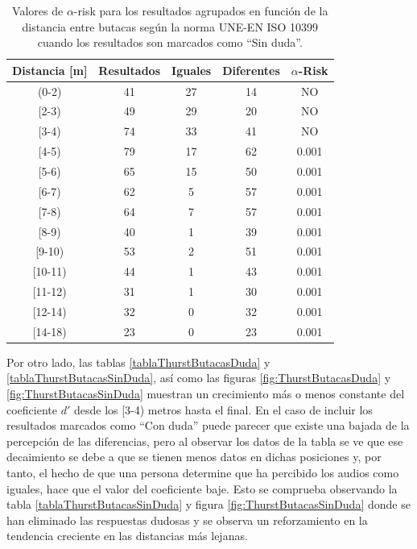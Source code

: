 \documentclass[11pt,a4paper,twoside]{book}
\begin{document}
		    \begin{table}
			\begin{center}
			\begin{scriptsize}
			\begin{tabular}{| c | c | c | c || c |}
			    \hline
				\textbf{Distancia [m]}&\textbf{Resultados}&\textbf{Iguales}&\textbf{Diferentes}&\textbf{$\alpha$-Risk}\\ \hline
                (0-2)&41&27&14&NO\\ \hline
                [2-3)&49&29&20&NO\\ \hline
                [3-4)&74&33&41&NO\\ \hline
                [4-5)&79&17&62&0.001\\ \hline
                [5-6)&65&15&50&0.001\\ \hline
                [6-7)&62&5&57&0.001\\ \hline
                [7-8)&64&7&57&0.001\\ \hline
                [8-9)&40&1&39&0.001\\ \hline
                [9-10)&53&2&51&0.001\\ \hline
                [10-11)&44&1&43&0.001\\ \hline
                [11-12)&31&1&30&0.001\\ \hline
                [12-14)&32&0&32&0.001\\ \hline
                [14-18)&23&0&23&0.001\\ \hline
			\end{tabular}
			\caption{Valores de $\alpha$-risk para los resultados agrupados en función de la distancia entre butacas según la norma UNE-EN ISO 10399 cuando los resultados son marcados como ``Sin duda''.}
			\label{tablaISOButacasSinDuda}
			\end{scriptsize}
			\end{center}	
		    \end{table}
            
            \newpage
            Por otro lado, las tablas \ref{tablaThurstButacasDuda} y \ref{tablaThurstButacasSinDuda}, así como las figuras \ref{fig:ThurstButacasDuda} y \ref{fig:ThurstButacasSinDuda} muestran un crecimiento más o menos constante del coeficiente $d'$ desde los [3-4) metros hasta el final. En el caso de incluir los resultados marcados como ``Con duda'' puede parecer que existe una bajada de la percepción de las diferencias, pero al observar los datos de la tabla se ve que ese decaimiento se debe a que se tienen menos datos en dichas posiciones y, por tanto, el hecho de que una persona determine que ha percibido los audios como iguales, hace que el valor del coeficiente baje. Esto se comprueba observando la tabla \ref{tablaThurstButacasSinDuda} y figura \ref{fig:ThurstButacasSinDuda} donde se han eliminado las respuestas dudosas y se observa un reforzamiento en la tendencia creciente en las distancias más lejanas.\newline
            
\end{document}

